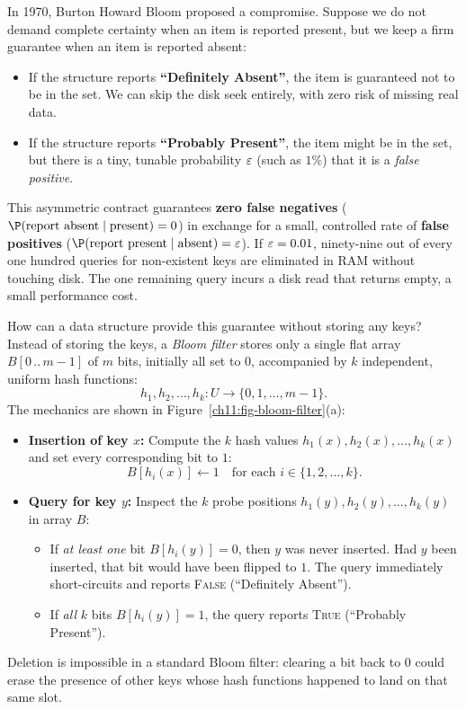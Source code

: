 In 1970, Burton Howard Bloom proposed a compromise. Suppose we do not demand complete certainty when an item is reported present, but we keep a firm guarantee when an item is reported absent:
\begin{itemize}
  \item If the structure reports \textbf{``Definitely Absent''}, the item is guaranteed not to be in the set. We can skip the disk seek entirely, with zero risk of missing real data.
  \item If the structure reports \textbf{``Probably Present''}, the item might be in the set, but there is a tiny, tunable probability $\varepsilon$ (such as $1\%$) that it is a \emph{false positive}.
\end{itemize}
This asymmetric contract guarantees \textbf{zero false negatives} ($\P(\text{report absent} \mid \text{present}) = 0$) in exchange for a small, controlled rate of \textbf{false positives} ($\P(\text{report present} \mid \text{absent}) = \eps$). If $\varepsilon = 0.01$, ninety-nine out of every one hundred queries for non-existent keys are eliminated in RAM without touching disk. The one remaining query incurs a disk read that returns empty, a small performance cost.

How can a data structure provide this guarantee without storing any keys? Instead of storing the keys, a \emph{Bloom filter} stores only a single flat array $B[0\,..\,m-1]$ of $m$ bits, initially all set to $0$, accompanied by $k$ independent, uniform hash functions:
\[
  h_1, h_2, \dots, h_k : U \to \{0, 1, \dots, m-1\}.
\]
The mechanics are shown in Figure~\ref{ch11:fig-bloom-filter}(a):
\begin{itemize}
  \item \textbf{Insertion of key $x$:} Compute the $k$ hash values $h_1(x), h_2(x), \dots, h_k(x)$ and set every corresponding bit to $1$:
  \[
    B[h_i(x)] \gets 1 \quad \text{for each } i \in \{1, 2, \dots, k\}.
  \]
  \item \textbf{Query for key $y$:} Inspect the $k$ probe positions $h_1(y), h_2(y), \dots, h_k(y)$ in array $B$:
  \begin{itemize}
    \item If \emph{at least one} bit $B[h_i(y)] = 0$, then $y$ was never inserted. Had $y$ been inserted, that bit would have been flipped to $1$. The query immediately short-circuits and reports \textsc{False} (``Definitely Absent'').
    \item If \emph{all} $k$ bits $B[h_i(y)] = 1$, the query reports \textsc{True} (``Probably Present'').
  \end{itemize}
\end{itemize}
Deletion is impossible in a standard Bloom filter: clearing a bit back to $0$ could erase the presence of other keys whose hash functions happened to land on that same slot.

